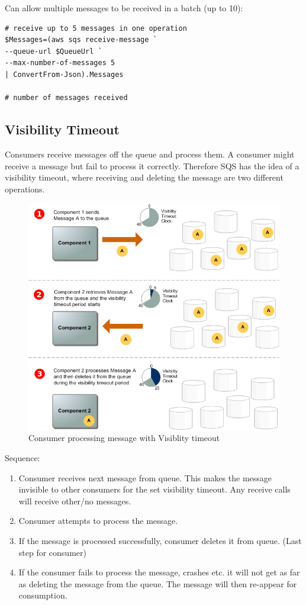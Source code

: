 \documentclass{pgnotes}
\begin{document}
Can allow multiple messages to be received in a batch (up to 10):

\begin{verbatim}
# receive up to 5 messages in one operation
$Messages=(aws sqs receive-message `
--queue-url $QueueUrl `
--max-number-of-messages 5 
| ConvertFrom-Json).Messages

# number of messages received
\end{verbatim}

\subsection{Visibility Timeout}\label{visibility-timeout}

Consumers receive messages off the queue and process them. A consumer
might receive a message but fail to process it correctly. Therefore SQS
has the idea of a visibility timeout, where receiving and deleting the
message are two different operations.

\begin{figure}
\centering
\includegraphics[width=0.6\linewidth]{sqs_message_lifecycle}
\caption{Consumer processing message with Visiblity timeout{}}
\end{figure}

Sequence:

\begin{enumerate}
\def\labelenumi{\arabic{enumi}.}
\item
  Consumer receives next message from queue. This makes the message
  invisible to other consumers for the set visibility timeout. Any
  receive calls will receive other/no messages.
\item
  Consumer attempts to process the message.
\item
  If the message is processed successfully, consumer deletes it from
  queue. (Last step for consumer)
\item
  If the consumer fails to process the message, crashes etc. it will not
  get as far as deleting the message from the queue. The message will
  then re-appear for consumption.
\end{enumerate}
\end{document}
